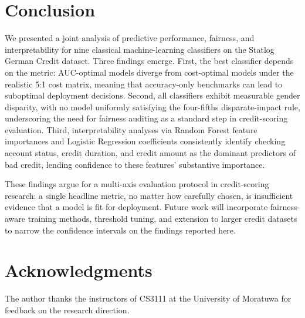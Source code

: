 \documentclass[conference]{IEEEtran}
\begin{document}
\section{Conclusion}\label{sec:conclusion}

We presented a joint analysis of predictive performance, fairness, and interpretability for nine classical machine-learning classifiers on the Statlog German Credit dataset. Three findings emerge. First, the best classifier depends on the metric: AUC-optimal models diverge from cost-optimal models under the realistic 5:1 cost matrix, meaning that accuracy-only benchmarks can lead to suboptimal deployment decisions. Second, all classifiers exhibit measurable gender disparity, with no model uniformly satisfying the four-fifths disparate-impact rule, underscoring the need for fairness auditing as a standard step in credit-scoring evaluation. Third, interpretability analyses via Random Forest feature importances and Logistic Regression coefficients consistently identify checking account status, credit duration, and credit amount as the dominant predictors of bad credit, lending confidence to these features' substantive importance.

These findings argue for a multi-axis evaluation protocol in credit-scoring research: a single headline metric, no matter how carefully chosen, is insufficient evidence that a model is fit for deployment. Future work will incorporate fairness-aware training methods, threshold tuning, and extension to larger credit datasets to narrow the confidence intervals on the findings reported here.

\section*{Acknowledgments}
The author thanks the instructors of CS3111 at the University of Moratuwa for feedback on the research direction.
\end{document}
